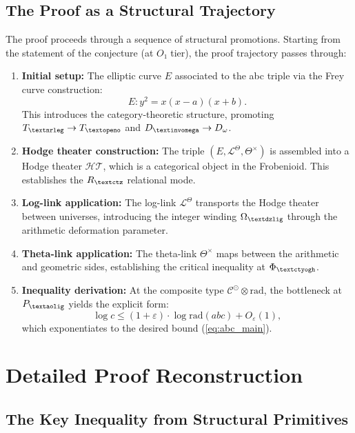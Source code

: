 \documentclass[12pt]{article}
\newcommand{\invomega}{\text{\textinvomega}}
\newcommand{\nrleg}{\text{\textnrleg}}
\newcommand{\aolig}{\text{\textaolig}}
\newcommand{\ctyogh}{\text{\textctyogh}}
\newcommand{\openo}{\text{\textopeno}}
\newcommand{\ctz}{\text{\textctz}}
\newcommand{\dzlig}{\text{\textdzlig}}
\begin{document}
\subsection{The Proof as a Structural Trajectory}

The proof proceeds through a sequence of structural promotions. Starting from the statement of the conjecture (at $O₁$ tier), the proof trajectory passes through:

\begin{enumerate}
\item \textbf{Initial setup:} The elliptic curve $E$ associated to the abc triple via the Frey curve construction:
\begin{equation}
E: y^2 = x(x-a)(x+b).
\end{equation}
This introduces the category-theoretic structure, promoting $T_{\nrleg} \to T_{\openo}$ and $D_{\invomega} \to D_\omega$.

\item \textbf{Hodge theater construction:} The triple $(E, \mathcal{L}^\Theta, \Theta^\times)$ is assembled into a Hodge theater $\mathcal{HT}$, which is a categorical object in the Frobenioid. This establishes the $R_{\ctz}$ relational mode.

\item \textbf{Log-link application:} The log-link $\mathcal{L}^\Theta$ transports the Hodge theater between universes, introducing the integer winding $\Omega_{\dzlig}$ through the arithmetic deformation parameter.

\item \textbf{Theta-link application:} The theta-link $\Theta^\times$ maps between the arithmetic and geometric sides, establishing the critical inequality at $\Phi_{\ctyogh}$.

\item \textbf{Inequality derivation:} At the composite type $\mathcal{C}^\odot \otimes \text{rad}$, the bottleneck at $P_{\aolig}$ yields the explicit form:
\begin{equation}
\log c \leq (1+\varepsilon) \cdot \log \text{rad}(abc) + O_\varepsilon(1),
\end{equation}
which exponentiates to the desired bound (\ref{eq:abc_main}).
\end{enumerate}
\section{Detailed Proof Reconstruction}

\subsection{The Key Inequality from Structural Primitives}
\end{document}
